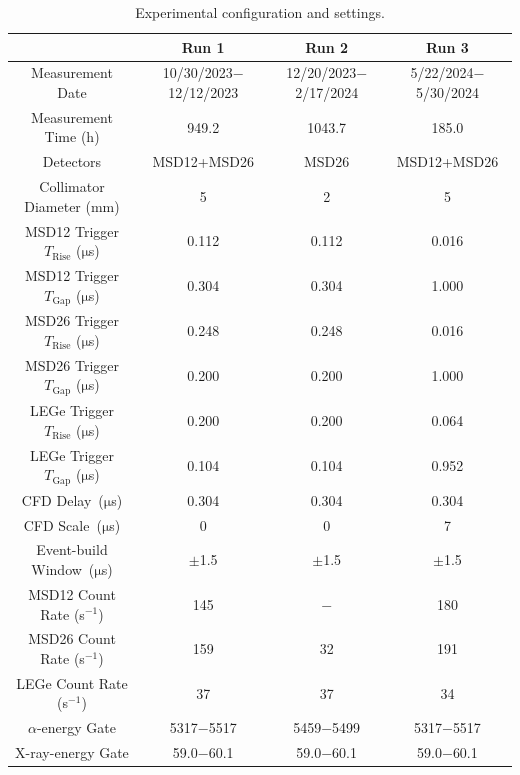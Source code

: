 \documentclass[aps,UTF8,prc,twocolumn,preprintnumbers,amsmath,amssymb,floatfix]{revtex4-2}
\begin{document}
\begin{table}[htbp!]
\caption{\label{Settings} Experimental configuration and settings.}
\begin{center}
\renewcommand{\arraystretch}{1.1}  %
\begin{ruledtabular}
\begin{tabular}{cccc}
   & Run 1  & Run 2  & Run 3\\
\hline
Measurement Date & 10/30/2023$-$12/12/2023 & 12/20/2023$-$2/17/2024 & 5/22/2024$-$5/30/2024 \\
Measurement Time (h) & 949.2 & 1043.7 & 185.0 \\
Detectors & MSD12+MSD26 & MSD26 & MSD12+MSD26 \\
Collimator Diameter (mm) & 5 & 2 & 5 \\
MSD12 Trigger $T_{\mathrm{Rise}}$ ($\mathrm{\mu}$s) & 0.112 & 0.112 & 0.016 \\
MSD12 Trigger $T_{\mathrm{Gap}}$ ($\mathrm{\mu}$s) & 0.304 & 0.304 & 1.000 \\
MSD26 Trigger $T_{\mathrm{Rise}}$ ($\mathrm{\mu}$s) & 0.248 & 0.248 & 0.016 \\
MSD26 Trigger $T_{\mathrm{Gap}}$ ($\mathrm{\mu}$s) & 0.200 & 0.200 & 1.000 \\
LEGe Trigger $T_{\mathrm{Rise}}$ ($\mathrm{\mu}$s) & 0.200 & 0.200 & 0.064 \\
LEGe Trigger $T_{\mathrm{Gap}}$ ($\mathrm{\mu}$s) & 0.104 & 0.104 & 0.952 \\
CFD Delay~($\mathrm{\mu}$s) & 0.304 & 0.304 & 0.304 \\
CFD Scale~($\mathrm{\mu}$s) & 0 & 0 & 7 \\
Event-build Window~($\mathrm{\mu}$s) & $\pm$1.5 & $\pm$1.5 & $\pm$1.5 \\
MSD12 Count Rate (s$^{-1}$) & 145 & $-$ & 180 \\
MSD26 Count Rate (s$^{-1}$) & 159 & 32 & 191 \\
LEGe Count Rate (s$^{-1}$) & 37 & 37 & 34 \\
$\alpha$-energy Gate & 5317$-$5517 & 5459$-$5499 & 5317$-$5517 \\
X-ray-energy Gate & 59.0$-$60.1 & 59.0$-$60.1 & 59.0$-$60.1 \\
\end{tabular}
\end{ruledtabular}
\end{center}
\end{table}
\end{document}

